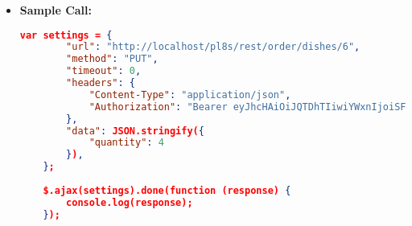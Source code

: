\begin{itemize}
    \item \textbf{Sample Call:}
		\begin{lstlisting}[language=json]		
	var settings = {
		"url": "http://localhost/pl8s/rest/order/dishes/6",
		"method": "PUT",
		"timeout": 0,
		"headers": {
			"Content-Type": "application/json",
			"Authorization": "Bearer eyJhcHAiOiJQTDhTIiwiYWxnIjoiSFM1MTIifQ.eyJ1aWQiOjMsInJvbCI6ImN1c3RvbWVyI iwic3RyIjoiY3VzX1B3OHJKbmd5eldOcmZ5IiwiZGF0IjoxNzE0MzQyNjAxNjMwfQ.RrH8oj pudntUVEZVnbvVw1GpUEU56tdnhnCSrnCqoHgUAwMMxXJDcTMfKazQmrIZ_OSfges7-lECny 6p-t5ITA"
		},
		"data": JSON.stringify({
			"quantity": 4
		}),
	};
	
	$.ajax(settings).done(function (response) {
		console.log(response);
	});
	\end{lstlisting}
  \end{itemize}		
